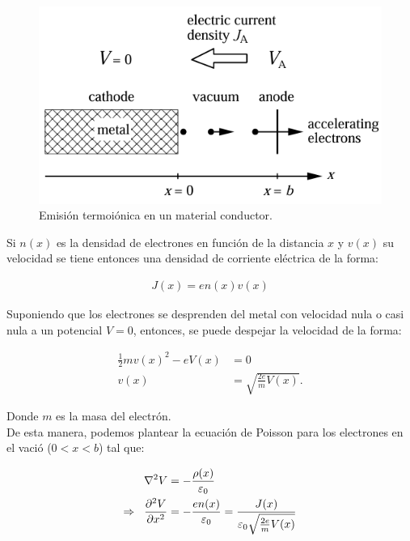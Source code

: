 \documentclass[%
 reprint,
 amsmath,amssymb,
 aps,
]{revtex4-2}
\begin{document}
\begin{figure}[H]
    \centering
    \includegraphics[width=0.8\linewidth]{imagenes/Emisión termoiónica.png}
    \caption{Emisión termoiónica en un material conductor.}
    \label{em1}
\end{figure}

\vspace{0.2 cm}
Si $n(x)$ es la densidad de electrones en función de la distancia $x$ y $v(x)$ su velocidad se tiene entonces una densidad de corriente eléctrica de la forma:

\begin{align*}
    J(x) = en(x)v(x)
\end{align*}

\vspace{0.2 cm}
Suponiendo que los electrones se desprenden del metal con velocidad nula o casi nula a un potencial $V= 0$, entonces, se puede despejar la velocidad de la forma:

    \begin{align*}
        \frac{1}{2}mv(x)^{2} - eV(x) &= 0\\
        v(x) &= \sqrt{\frac{2e}{m}V(x)}.
    \end{align*}

\vspace{0.2 cm}
Donde $m$ es la masa del electrón.
\\

De esta manera, podemos plantear la ecuación de Poisson para los electrones en el vació ($0<x<b$) tal que:

\begin{align*}
    \nabla^{2}V &= -\frac{\rho (x)}{\varepsilon_{0}} \\ \Rightarrow \hspace{0.2 cm} \frac{\partial^{2}V}{\partial x^{2}} &= -\frac{en(x)}{\varepsilon_{0}} = \frac{J(x)}{\varepsilon_{0}\sqrt{\frac{2e}{m}V(x)}}
\end{align*}
\end{document}
